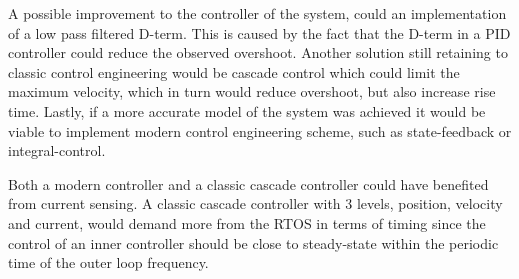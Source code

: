 \documentclass[../../main]{subfiles}
\begin{document}

A possible improvement to the controller of the system, could an implementation of a low pass filtered D-term. This is caused by the fact that the D-term in a PID controller could reduce the observed overshoot.
Another solution still retaining to classic control engineering would be cascade control which could limit the maximum velocity, which in turn would reduce overshoot, but also increase rise time.
Lastly, if a more accurate model of the system was achieved it would be viable to implement modern control engineering scheme, such as state-feedback or integral-control.

Both a modern controller and a classic cascade controller	could have benefited from current sensing.
A classic cascade controller with 3 levels, position, velocity and current, would demand more from the RTOS in terms of timing since the control of an inner controller should be close to steady-state within the periodic time of the outer loop frequency.
\end{document}
